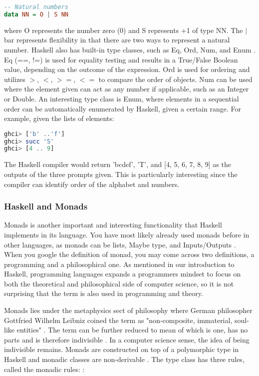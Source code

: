 \documentclass{article}
\begin{document}
\begin{lstlisting}[language=haskell]
-- Natural numbers
data NN = O | S NN
\end{lstlisting}

\noindent 
where O represents the number zero (0) and S represents +1 of type NN. The $|$ bar represents flexibility in that there are two ways to represent a natural number. Haskell also has built-in type classes, such as Eq, Ord, Num, and Enum \cite{LYH Types}. Eq (==, !=) is used for equality testing and results in a True/False Boolean value, depending on the outcome of the expression. Ord is used for ordering and utilizes $>$, $<$, $>=$, $<=$ to compare the order of objects. Num can be used where the element given can act as any number if applicable, such as an Integer or Double. An interesting type class is Enum, where elements in a sequential order can be automatically enumerated by Haskell, given a certain range. For example, given the lists of elements:

\begin{lstlisting}[language=haskell]
ghci> ['b' ..'f']
ghci> succ 'S'
ghci> [4 .. 9] 
\end{lstlisting}

\noindent
The Haskell compiler would return 'bcdef', 'T', and [4, 5, 6, 7, 8, 9] as the outputs of the three prompts given. This is particularly interesting since the compiler can identify order of the alphabet and numbers. 

\subsubsection{Haskell and Monads}

Monads is another important and interesting functionality that Haskell implements in its language. You have most likely already used monads before in other languages, as monads can be lists, Maybe type, and Inputs/Outputs \cite{Haskell.org Monads}. When you google the definition of monad, you may come across two definitions, a programming and a philosophical one. As mentioned in our introduction to Haskell, programming languages expands a programmers mindset to focus on both the theoretical and philosophical side of computer science, so it is not surprising that the term is also used in programming and theory.

\medskip\noindent
Monads lies under the metaphysics sect of philosophy where German philosopher Gottfried Wilhelm Leibniz coined the term as "non-composite, immaterial, soul-like entities" \cite{IEOP}. The term can be further reduced to mean of which is one, has no parts and is therefore indivisible \cite{IEOP}. In a computer science sense, the idea of being indivisible remains. Monads are constructed on top of a polymorphic type in Haskell and monadic classes are non-derivable \cite{Haskell Monads}. The type class has three rules, called the monadic rules: \cite{TP Monads}:
\end{document}
